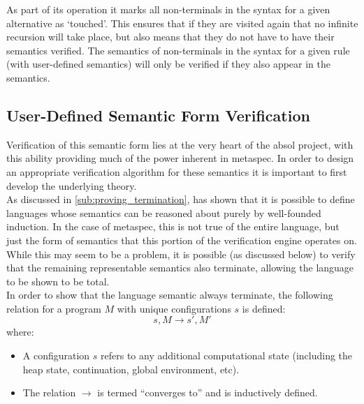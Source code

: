 As part of its operation it marks all non-terminals in the syntax for a given alternative as `touched'.
This ensures that if they are visited again that no infinite recursion will take place, but also means that they do not have to have their semantics verified.
The semantics of non-terminals in the syntax for a given rule (with user-defined semantics) will only be verified if they also appear in the semantics.


\subsection{User-Defined Semantic Form Verification} %
\label{sub:user_defined_semantic_form_verification}
Verification of this semantic form lies at the very heart of the \gls{absol} project, with this ability providing much of the power inherent in \gls{metaspec}.
In order to design an appropriate verification algorithm for these semantics it is important to first develop the underlying theory.\\

As discussed in \autoref{sub:proving_termination}, \citet{nordstrom1988terminating} has shown that it is possible to define languages whose semantics can be reasoned about purely by well-founded induction.
In the case of \gls{metaspec}, this is not true of the entire language, but just the form of semantics that this portion of the verification engine operates on.
While this may seem to be a problem, it is possible (as discussed below) to verify that the remaining representable semantics also terminate, allowing the language to be shown to be total.\\

In order to show that the language semantic always terminate, the following relation for a program $M$ with unique configurations $s$ is defined:
\begin{equation*}
    s, M \to s', M'
    \label{eq:program_convergence}
\end{equation*}
where:
\begin{itemize}
    \item A configuration $s$ refers to any additional computational state (including the heap state, continuation, global environment, etc).
    \item The relation $\to$ is termed ``converges to'' and is inductively defined.
\end{itemize}

